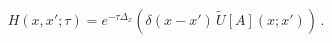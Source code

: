 \begin{equation}
  \label{eq:heatgaugecov}
H(x,x';\tau) = e^{-\tau \Delta_x} \left( \delta(x-x') \, \tilde U[A](x;x') \right) \,.
\end{equation}

